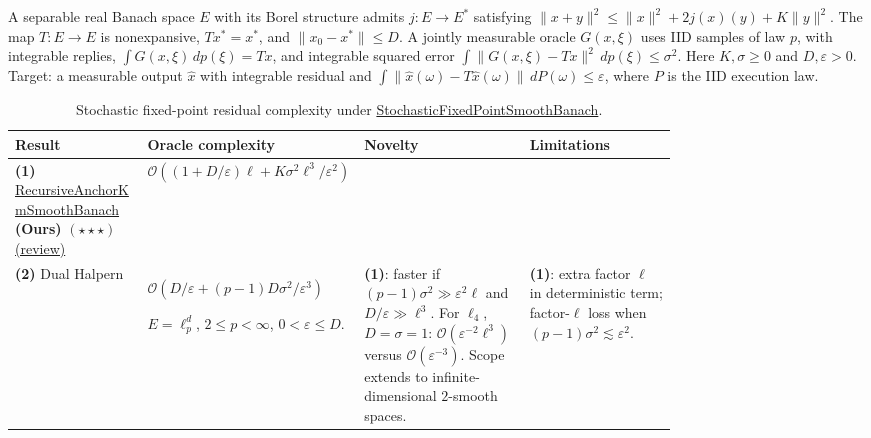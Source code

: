\begin{table}[tp]
\centering
\caption{Stochastic fixed-point residual complexity under \href{https://github.com/k3nfalt/longtails/blob/main/LongTails/Setups/StochasticFixedPointSmoothBanach.lean}{StochasticFixedPointSmoothBanach}.}\label{tab:StochasticFixedPointSmoothBanach}
\parbox{\linewidth}{\footnotesize A separable real Banach space $E$ with its Borel structure admits $j:E\to E^*$ satisfying $\|x+y\|^2\leq\|x\|^2+2j(x)(y)+K\|y\|^2$. The map $T:E\to E$ is nonexpansive, $Tx^*=x^*$, and $\|x_0-x^*\|\leq D$. A jointly measurable oracle $G(x,\xi)$ uses IID samples of law $p$, with integrable replies, $\int G(x,\xi)\,dp(\xi)=Tx$, and integrable squared error $\int\|G(x,\xi)-Tx\|^2\,dp(\xi)\leq\sigma^2$. Here $K,\sigma\geq0$ and $D,\varepsilon>0$. Target: a measurable output $\hat x$ with integrable residual and $\int\|\hat x(\omega)-T\hat x(\omega)\|\,dP(\omega)\leq\varepsilon$, where $P$ is the IID execution law.}\par\smallskip
\begin{threeparttable}
\footnotesize
\setlength{\tabcolsep}{4pt}\renewcommand{\arraystretch}{1.25}
\begin{tabularx}{\linewidth}{@{}>{\raggedright\arraybackslash}p{0.20\linewidth}>{\raggedright\arraybackslash}p{0.32\linewidth}>{\raggedright\arraybackslash}p{0.25\linewidth}>{\raggedright\arraybackslash}X@{}}
\toprule
\textbf{Result} & \textbf{Oracle complexity} & \textbf{Novelty} & \textbf{Limitations} \\
\midrule
\textbf{(1)} \href{https://github.com/k3nfalt/longtails/blob/main/LongTails/Theorems/RecursiveAnchorKmSmoothBanach.lean}{Recursive\allowbreak Anchor\allowbreak Km\allowbreak Smooth\allowbreak Banach} \textbf{(Ours)} $(\star\star\star)$ \href{https://github.com/k3nfalt/longtails/blob/main/scripts/reviews/RecursiveAnchorKmSmoothBanach.md}{(review)}
& $\mathcal{O}\!\left((1+D/\varepsilon)\ell+K\sigma^2\ell^3/\varepsilon^2\right)$ & & \\
\midrule[1.2pt]
\textbf{(2)} Dual Halpern \citep[Thm.~3]{sfpLee2026v1}
& $\mathcal{O}\!\left(D/\varepsilon+(p-1)D\sigma^2/\varepsilon^3\right)$\par $E=\ell_p^d$, $2\leq p<\infty$, $0<\varepsilon\leq D$.
& \textbf{(1)}: faster if $(p-1)\sigma^2\gg\varepsilon^2\ell$ and $D/\varepsilon\gg\ell^3$. For $\ell_4$, $D=\sigma=1$: $\mathcal{O}(\varepsilon^{-2}\ell^3)$ versus $\mathcal{O}(\varepsilon^{-3})$. Scope extends to infinite-dimensional $2$-smooth spaces.
& \textbf{(1)}: extra factor $\ell$ in deterministic term; factor-$\ell$ loss when $(p-1)\sigma^2\lesssim\varepsilon^2$. \\

\end{tabularx}
\end{threeparttable}
\end{table}
